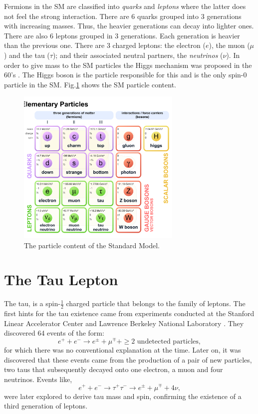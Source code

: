 Fermions in the SM are classified into \textit{quarks} and \textit{leptons} where the latter does not feel the strong interaction. There are 6 quarks grouped into 3 generations with increasing masses. Thus, the heavier generations can decay into lighter ones. There are also 6 leptons grouped in 3 generations. Each generation is heavier than the previous one. There are 3 charged leptons: the electron ($e$), the muon ($\mu$) and the tau ($\tau$); and their associated neutral partners, the \textit{neutrinos} ($\nu$). In order to give mass to the SM particles the Higgs mechanism was proposed in the 60's \cite{PhysRevLett.13.508,PhysRevLett.13.321,PhysRevLett.13.585}. The Higgs boson is the particle responsible for this and is the only spin-0 particle in the SM. Fig.\ref{Fig14} shows the SM particle content.
\begin{figure}[h]
	\centering
	\includegraphics[width=0.7\textwidth]{figures/Fig14}
	\caption{The particle content of the Standard Model.}
	\label{Fig14}
\end{figure}
\section{The Tau Lepton}\label{chap2sec1}
The tau, is a spin-$\frac{1}{2}$ charged particle that belongs to the family of leptons. The first hints for the tau existence came from experiments conducted at the Stanford Linear Accelerator Center and Lawrence Berkeley National Laboratory \cite{PhysRevLett.35.1489}. They discovered 64 events of the form:
\begin{equation}
	e^+ + e^- \to e^\pm + \mu^\mp + \geq \text{2 undetected particles},
\end{equation}
for which there was no conventional explanation at the time. Later on, it was discovered that these events came from the production of a pair of new particles, two taus that subsequently decayed onto one electron, a muon and four neutrinos. Events like,
\begin{equation}
e^+ + e^- \to \tau^+ \tau^- \to e^\pm + \mu^\mp + 4\nu,
\end{equation}	
were later explored to derive tau mass and spin, confirming the existence of a third generation of leptons. 

